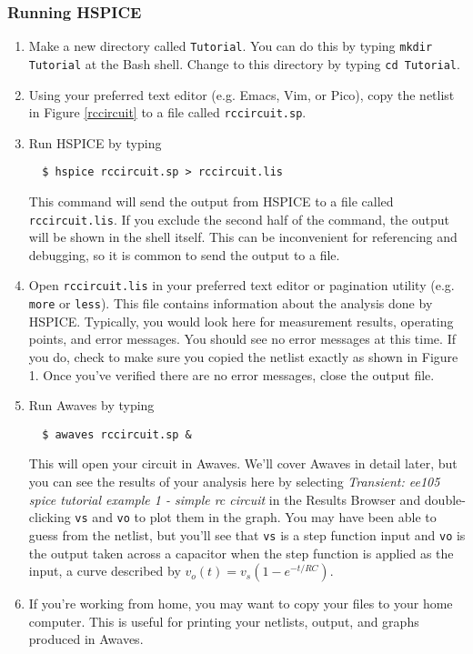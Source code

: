 \documentclass{article}
\begin{document}
\subsubsection{Running HSPICE}

\begin{enumerate}
  \item Make a new directory called \verb|Tutorial|. You can do this by typing \verb|mkdir Tutorial| at the Bash shell. Change to this directory by typing \verb|cd Tutorial|.
  \item Using your preferred text editor (e.g. Emacs, Vim, or Pico), copy the netlist in Figure \ref{rccircuit} to a file called \verb|rccircuit.sp|.
  \item Run HSPICE by typing 
    \begin{verbatim}  $ hspice rccircuit.sp > rccircuit.lis \end{verbatim}
      This command will send the output from HSPICE to a file called \verb|rccircuit.lis|. If you exclude the second half of the command, the output will be shown in the shell itself. This can be inconvenient for referencing and debugging, so it is common to send the output to a file.
  \item Open \verb|rccircuit.lis| in your preferred text editor or pagination utility (e.g. \verb|more| or \verb|less|). This file contains information about the analysis done by HSPICE. Typically, you would look here for measurement results, operating points, and error messages. You should see no error messages at this time. If you do, check to make sure you copied the netlist exactly as shown in Figure 1. Once you've verified there are no error messages, close the output file.
  \item Run Awaves by typing 
    \begin{verbatim}  $ awaves rccircuit.sp & \end{verbatim}
    This will open your circuit in Awaves. We'll cover Awaves in detail later, but you can see the results of your analysis here by selecting \textit{Transient: ee105 spice tutorial example 1 - simple rc circuit} in the Results Browser and double-clicking \verb|vs| and \verb|vo| to plot them in the graph. You may have been able to guess from the netlist, but you'll see that \verb|vs| is a step function input and \verb|vo| is the output taken across a capacitor when the step function is applied as the input, a curve described by $v_o(t) = v_s\left(1-e^{-t/RC}\right)$.
  \item If you're working from home, you may want to copy your files to your home computer. This is useful for printing your netlists, output, and graphs produced in Awaves.

\end{enumerate}
\end{document}
